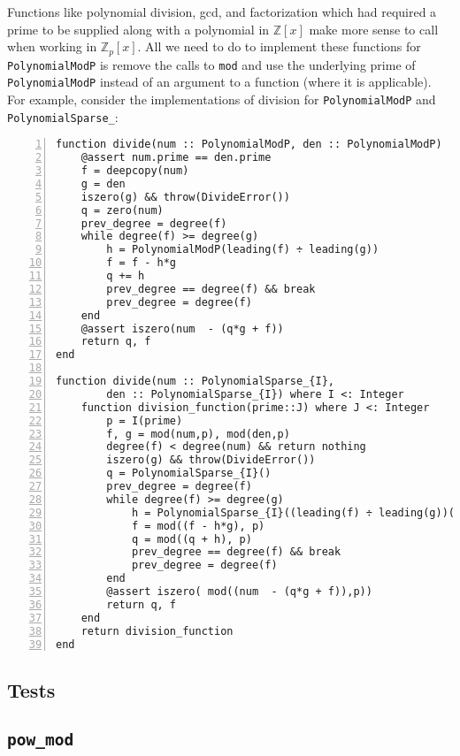 \documentclass{article}
\theoremstyle{plain}
\numberwithin{theorem}{section}
\numberwithin{example}{section}
\theoremstyle{definition}
\numberwithin{definition}{section}
\begin{document}
Functions like polynomial division, gcd, and factorization which had required
a prime to be supplied along with a polynomial in $\mathbb{Z}[x]$ make more
sense to call when working in $\mathbb{Z}_p[x]$. All we need to do to implement
these functions for \texttt{PolynomialModP} is remove the calls to \texttt{mod}
and use the underlying prime of \texttt{PolynomialModP} instead of an argument
to a function (where  it is applicable). For example, consider the
implementations of division for \texttt{PolynomialModP} and
\texttt{PolynomialSparse\_}:

\begin{codebox}
    \begin{Verbatim}[numbers=left,xleftmargin=5mm]
function divide(num :: PolynomialModP, den :: PolynomialModP)
    @assert num.prime == den.prime
    f = deepcopy(num)
    g = den
    iszero(g) && throw(DivideError())
    q = zero(num)
    prev_degree = degree(f)
    while degree(f) >= degree(g) 
        h = PolynomialModP(leading(f) ÷ leading(g))
        f = f - h*g
        q += h
        prev_degree == degree(f) && break
        prev_degree = degree(f)
    end
    @assert iszero(num  - (q*g + f))
    return q, f
end

function divide(num :: PolynomialSparse_{I},
        den :: PolynomialSparse_{I}) where I <: Integer
    function division_function(prime::J) where J <: Integer
        p = I(prime)
        f, g = mod(num,p), mod(den,p)
        degree(f) < degree(num) && return nothing 
        iszero(g) && throw(DivideError())
        q = PolynomialSparse_{I}()
        prev_degree = degree(f)
        while degree(f) >= degree(g) 
            h = PolynomialSparse_{I}((leading(f) ÷ leading(g))(p))  #syzergy 
            f = mod((f - h*g), p)
            q = mod((q + h), p)
            prev_degree == degree(f) && break
            prev_degree = degree(f)
        end
        @assert iszero( mod((num  - (q*g + f)),p))
        return q, f
    end
    return division_function
end
    \end{Verbatim}
\end{codebox}

\bigbreak

\subsection{Tests}


\bigbreak

\subsection{\texttt{pow\_mod}}
\end{document}
